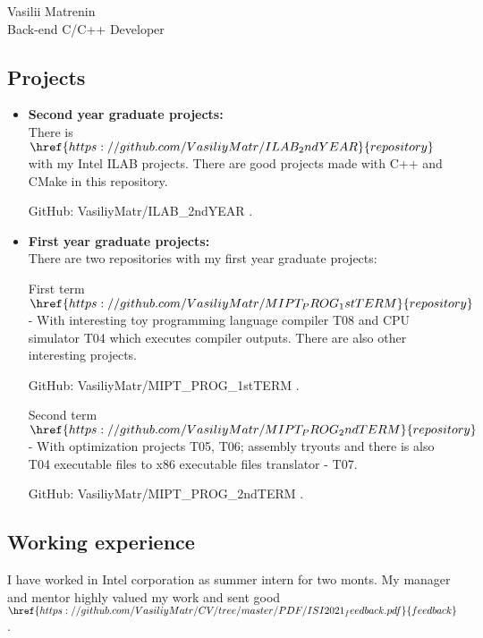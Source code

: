 
\begin{center}
    \Huge
    Vasilii Matrenin \\
    \Large
    Back-end C/C++ Developer
\end{center}

\vspace* {0.6cm}

\begin{minipage}[t]{12cm}

\subsection* {Projects}
\begin{itemize}

\item \textbf {Second year graduate projects:} \\
    There is $\href {https://github.com/VasiliyMatr/ILAB_2ndYEAR}{repository}$
    with my Intel ILAB projects. There are good projects made with C++ and CMake in
    this repository.

    GitHub: VasiliyMatr/ILAB\_2ndYEAR .

\item \textbf {First year graduate projects:} \\
    There are two repositories with my first year graduate projects:

    First term $\href {https://github.com/VasiliyMatr/MIPT_PROG_1stTERM}{repository}$
    - With interesting toy programming language compiler T08 and CPU
    simulator T04 which executes compiler outputs. There are also other
    interesting projects.

    GitHub: VasiliyMatr/MIPT\_PROG\_1stTERM .

    Second term $\href {https://github.com/VasiliyMatr/MIPT_PROG_2ndTERM}{repository}$
    - With optimization projects T05, T06; assembly tryouts and there is
    also T04 executable files to x86 executable files translator - T07.

    GitHub: VasiliyMatr/MIPT\_PROG\_2ndTERM .

\end{itemize}

\subsection* {Working experience}
I have worked in Intel corporation as summer intern for two monts. My manager and mentor
highly valued my work and sent good
$\href {https://github.com/VasiliyMatr/CV/tree/master/PDF/ISI2021_feedback.pdf}{feedback}$. \\


\end{minipage}
